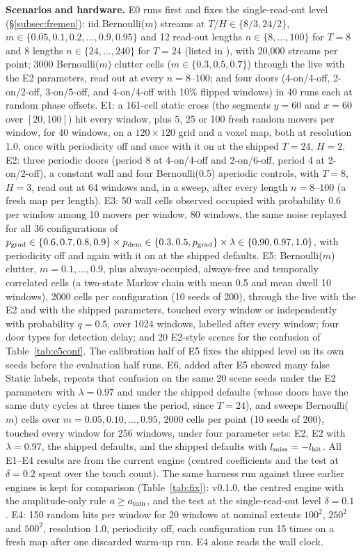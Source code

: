 \noindent\textbf{Scenarios and hardware.} E0 runs first and fixes the single-read-out level (\S\ref{subsec:fremen}): iid Bernoulli($m$) streams at $T/H\in\{8/3, 24/2\}$, $m\in\{0.05,0.1,0.2,\dots,0.9,0.95\}$ and 12 read-out lengths $n\in\{8,\dots,100\}$ for $T{=}8$ and 8 lengths $n\in\{24,\dots,240\}$ for $T{=}24$ (listed in ), with 20{,}000 streams per point; 3000 Bernoulli($m$) clutter cells ($m\in\{0.3,0.5,0.7\}$) through the live  with the E2 parameters, read out at every $n=8$--$100$; and four doors (4-on/4-off, 2-on/2-off, 3-on/5-off, and 4-on/4-off with 10\% flipped windows) in 40 runs each at random phase offsets. E1: a 161-cell static cross (the segments $y{=}60$ and $x{=}60$ over $[20,100]$) hit every window, plus 5, 25 or 100 fresh random movers per window, for 40 windows, on a $120{\times}120$ grid and a voxel map, both at resolution 1.0, once with periodicity off and once with it on at the shipped $T{=}24$, $H{=}2$. E2: three periodic doors (period 8 at 4-on/4-off and 2-on/6-off, period 4 at 2-on/2-off), a constant wall and four Bernoulli(0.5) aperiodic controls, with $T{=}8$, $H{=}3$, read out at 64 windows and, in a sweep, after every length $n=8$--$100$ (a fresh map per length). E3: 50 wall cells observed occupied with probability 0.6 per window among 10 movers per window, 80 windows, the same noise replayed for all 36 configurations of $p_{\mathrm{grad}}\in\{0.6,0.7,0.8,0.9\}\times p_{\mathrm{dem}}\in\{0.3,0.5,p_{\mathrm{grad}}\}\times\lambda\in\{0.90,0.97,1.0\}$, with periodicity off and again with it on at the shipped defaults. E5: Bernoulli($m$) clutter, $m=0.1,\dots,0.9$, plus always-occupied, always-free and temporally correlated cells (a two-state Markov chain with mean 0.5 and mean dwell 10 windows), 2000 cells per configuration (10 seeds of 200), through the live  with the E2 and with the shipped parameters, touched every window or independently with probability $q{=}0.5$, over 1024 windows, labelled after every window; four door types for detection delay; and 20 E2-style scenes for the confusion of Table~\ref{tab:e5conf}. The calibration half of E5 fixes the shipped level on its own seeds before the evaluation half runs. E6, added after E5 showed many false Static labels, repeats that confusion on the same 20 scene seeds under the E2 parameters with $\lambda{=}0.97$ and under the shipped defaults (whose doors have the same duty cycles at three times the period, since $T{=}24$), and sweeps Bernoulli($m$) cells over $m=0.05,0.10,\dots,0.95$, 2000 cells per point (10 seeds of 200), touched every window for 256 windows, under four parameter sets: E2, E2 with $\lambda{=}0.97$, the shipped defaults, and the shipped defaults with $l_{\mathrm{miss}}=-l_{\mathrm{hit}}$. All E1--E4 results are from the current engine (centred coefficients and the test at $\delta{=}0.2$ spent over the touch count). The same harness run against three earlier engines is kept for comparison (Table~\ref{tab:fix}): v0.1.0, the centred engine with the amplitude-only rule $a\ge a_{\min}$, and the test at the single-read-out level $\delta{=}0.1$. E4: 150 random hits per window for 20 windows at nominal extents $100^2$, $250^2$ and $500^2$, resolution 1.0, periodicity off, each configuration run 15 times on a fresh map after one discarded warm-up run. E4 alone reads the wall clock. 